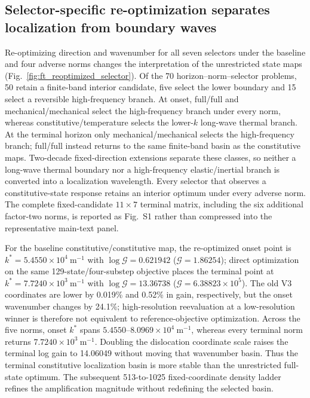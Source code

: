 \subsection{Selector-specific re-optimization separates localization from boundary waves}

Re-optimizing direction and wavenumber for all seven selectors under the
baseline and four adverse norms changes the interpretation of the unrestricted
state maps (Fig.~\ref{fig:ft_reoptimized_selector}).  Of the 70 horizon--norm--selector
problems, 50 retain a finite-band interior candidate, five select the lower
boundary and 15 select a reversible high-frequency branch.  At onset,
full/full and mechanical/mechanical select the high-frequency branch under
every norm, whereas constitutive/temperature selects the lower-$k$ long-wave
thermal branch.  At the terminal horizon only mechanical/mechanical selects
the high-frequency branch; full/full instead returns to the same finite-band
basin as the constitutive maps.  Two-decade fixed-direction extensions
separate these classes, so neither a long-wave thermal boundary nor a
high-frequency elastic/inertial branch is converted into a localization
wavelength.  Every selector that observes a constitutive-state response
retains an interior optimum under every adverse norm.
The complete fixed-candidate $11\times7$ terminal matrix, including the six
additional factor-two norms, is reported as Fig.~S1 rather than compressed
into the representative main-text panel.

For the baseline constitutive/constitutive map, the re-optimized onset point is
$k^*=5.4550\times10^4~\mathrm{m^{-1}}$ with
$\log\mathcal G=0.621942$ ($\mathcal G=1.86254$); direct optimization on the
same 129-state/four-substep objective places the terminal point at
$k^*=7.7240\times10^3~\mathrm{m^{-1}}$ with
$\log\mathcal G=13.36738$ ($\mathcal G=6.38823\times10^5$).  The old V3
coordinates are lower by 0.019\% and 0.52\% in gain, respectively, but the
onset wavenumber changes by 24.1\%; high-resolution reevaluation at a
low-resolution winner is therefore not equivalent to reference-objective
optimization.  Across the five norms, onset $k^*$ spans
$5.4550$--$8.0969\times10^4~\mathrm{m^{-1}}$, whereas every terminal norm
returns $7.7240\times10^3~\mathrm{m^{-1}}$.  Doubling the dislocation
coordinate scale raises the terminal log gain to 14.06049 without moving that
wavenumber basin.  Thus the terminal constitutive localization basin is more
stable than the unrestricted full-state optimum.  The subsequent 513-to-1025
fixed-coordinate density ladder refines the amplification magnitude without
redefining the selected basin.

